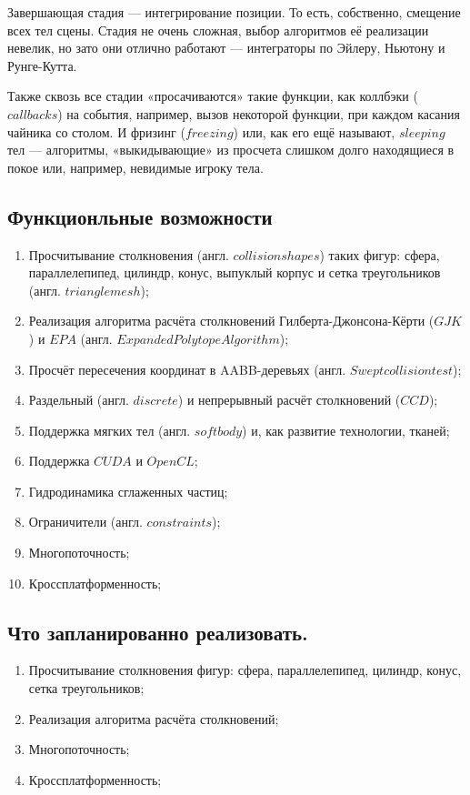 \documentclass[12pt, oneside]{article}
\begin{document}
Завершающая стадия — интегрирование позиции. То есть, собственно, смещение всех тел сцены. Стадия не очень сложная, 
выбор алгоритмов её реализации невелик, но зато они отлично работают — интеграторы по Эйлеру, Ньютону и Рунге-Кутта.

Также сквозь все стадии «просачиваются» такие функции, как коллбэки ($callbacks$) на события, например, вызов некоторой 
функции, при каждом касания чайника со столом. И фризинг ($freezing$) или, как его ещё называют, $sleeping$ тел — 
алгоритмы, «выкидывающие» из просчета слишком долго находящиеся в покое или, например, невидимые игроку тела.

\subsection{Функционльные возможности}
\begin{enumerate} 
\item Просчитывание столкновения (англ. $collision shapes$) таких фигур: сфера, параллелепипед, цилиндр, конус, 
выпуклый корпус и сетка треугольников (англ. $triangle mesh$);
\item Реализация алгоритма расчёта столкновений Гилберта-Джонсона-Кёрти ($GJK$) и $EPA$ (англ. 
$Expanded Polytope Algorithm$);
\item Просчёт пересечения координат в AABB-деревьях (англ. $Swept collision test$);
\item Раздельный (англ. $discrete$) и непрерывный расчёт столкновений ($CCD$);
\item Поддержка мягких тел (англ. $soft body$) и, как развитие технологии, тканей;
\item Поддержка $CUDA$ и $OpenCL$;
\item Гидродинамика сглаженных частиц;
\item Ограничители (англ. $constraints$);
\item Многопоточность;
\item Кроссплатформенность;
\end{enumerate}

\subsection{Что запланированно реализовать.}
\begin{enumerate} 
\item Просчитывание столкновения фигур: сфера, параллелепипед, цилиндр, конус, сетка треугольников;
\item Реализация алгоритма расчёта столкновений;
\item Многопоточность;
\item Кроссплатформенность;
\end{enumerate}
\end{document}
